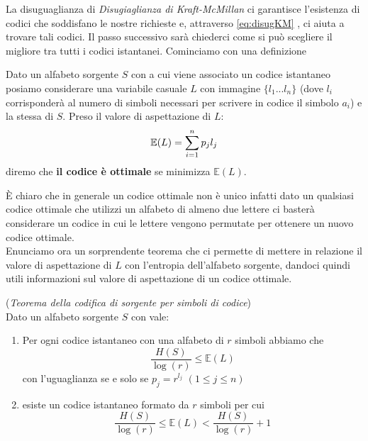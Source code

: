 La disuguaglianza di \textit{Disugiaglianza di Kraft-McMillan} ci garantisce l'esistenza di codici che soddisfano le nostre richieste e, attraverso \ref{eq:disugKM} , ci aiuta a trovare tali codici. Il passo successivo sarà chiederci come si può scegliere il migliore tra tutti i codici istantanei. Cominciamo con una definizione

\begin{defi}
Dato un alfabeto sorgente $S$ \va  con \lep  a cui viene associato un codice istantaneo posiamo considerare una variabile casuale $L$ con immagine $\{ l_1...l_n \}$ (dove $l_i$ corrisponderà al numero di simboli necessari per scrivere in codice il simbolo $a_i$) e \lep  la stessa di $S$. Preso il valore di aspettazione di $L$:
$$\mathbb{E}(L)=\sum_{i=1}^n p_j l_j$$ 
diremo che \textbf{il codice è ottimale} se minimizza $\mathbb{E}(L)$.
\end{defi}
È chiaro che in generale un codice ottimale non è unico infatti dato un qualsiasi codice ottimale che utilizzi un alfabeto di almeno due lettere ci basterà considerare un codice in cui le lettere vengono permutate per ottenere un nuovo codice ottimale.\\
Enunciamo ora un sorprendente teorema che ci permette di mettere in relazione il valore di aspettazione di $L$ con l'entropia dell'alfabeto sorgente, dandoci quindi utili informazioni sul valore di aspettazione di un codice ottimale.
 
\begin{teo}(\textit{Teorema della codifica di sorgente per simboli di codice})\\
Dato un alfabeto sorgente $S$ con \lep vale:
\begin{enumerate}
\item Per ogni codice istantaneo con una alfabeto di $r$ simboli abbiamo che
\begin{equation}
\frac{H(S)}{\log (r)} \leq \mathbb{E}(L)
\end{equation}
con l'uguaglianza se e solo se $p_j=r^{l_j}$ $(1 \leq j \leq n)$
\item esiste un codice istantaneo formato da $r$ simboli per cui
\begin{equation}
\frac{H(S)}{\log (r)} \leq \mathbb{E}(L) < \frac{H(S)}{\log (r)} +1
\end{equation}
\end{enumerate}
\end{teo}

